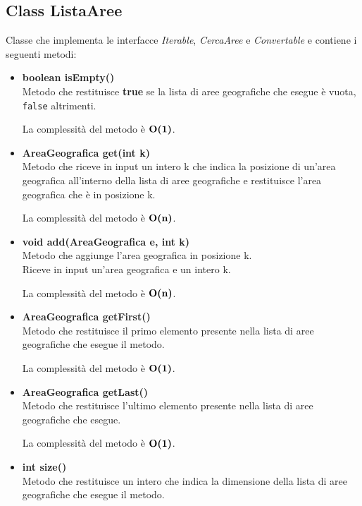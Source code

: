 \documentclass[a4paper, 12pt]{scrreprt}
\begin{document}
			\subsection{Class ListaAree}
			Classe che implementa le interfacce \textsl{Iterable}, \textsl{CercaAree} e \textsl{Convertable} e contiene i seguenti metodi:
			\begin{itemize}
				\item \textbf{boolean isEmpty()}
				\\Metodo che restituisce \textbf{true} se la lista di aree geografiche che esegue \`e vuota, \verb!false! altrimenti.
				
				La complessit\`a del metodo \`e $\mathbf{O}\textbf{(1)}$.
				
				\item \textbf{AreaGeografica get(int k)}
				\\Metodo che riceve in input un intero k che indica la posizione di un'area geografica all'interno della lista di aree geografiche e restituisce l'area geografica che \`e in posizione k.
				
				La complessit\`a del metodo \`e $\mathbf{O}\textbf{(n)}$.
				
				\item \textbf{void add(AreaGeografica e, int k)}
				\\Metodo che aggiunge l'area geografica in posizione k.
				\\Riceve in input un'area geografica e un intero k.
				
				La complessit\`a del metodo \`e $\mathbf{O}\textbf{(n)}$.
				
				\item \textbf{AreaGeografica getFirst()}
				\\Metodo che restituisce il primo elemento presente nella lista di aree geografiche che esegue il metodo.
				
				La complessit\`a del metodo \`e $\mathbf{O}\textbf{(1)}$.
				
				\item \textbf{AreaGeografica getLast()}
				\\Metodo che restituisce l'ultimo elemento presente nella lista di aree geografiche che esegue.
				
				La complessit\`a del metodo \`e $\mathbf{O}\textbf{(1)}$.
				\pagebreak
				\item \textbf{int size()}
				\\Metodo che restituisce un intero che indica la dimensione della lista di aree geografiche che esegue il metodo.
				

\end{itemize}
\end{document}
